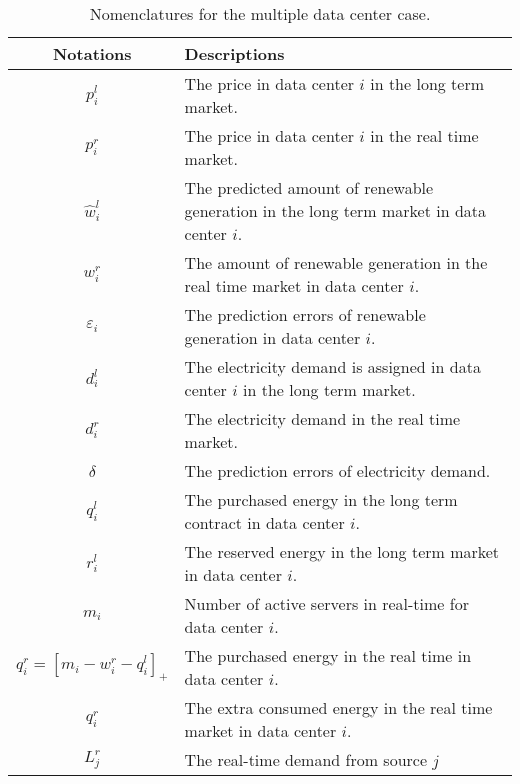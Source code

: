 \begin{table}
	\centering
	\caption{Nomenclatures for the multiple data center case.}
	\begin{tabular}{|c|p{4cm}|} \hline
		Notations & Descriptions \\ \hline \hline
		$p^{l}_i$ & The price in data center $i$ in the long term market. \\ \hline
		$p^{r}_i$ & The price in data center $i$ in the real time market. \\ \hline
		$\hat{w}^{l}_i$ & The predicted amount of renewable generation in the long term market in data center $i$. \\ \hline
		$w^{r}_i$ & The amount of renewable generation in the real time market in data center $i$. \\ \hline
		$\varepsilon_i$ & The prediction errors of renewable generation in data center $i$. \\ \hline
		$d^{l}_i$ & The electricity demand is assigned in data center $i$ in the long term market. \\ \hline
		$d^{r}_i$ & The electricity demand in the real time market. \\ \hline
		$\delta$ & The prediction errors of electricity demand. \\ \hline
		$q^{l}_i$ & The purchased energy in the long term contract in data center $i$. \\ \hline
		$r^{l}_i$ & The reserved energy in the long term market in data center $i$. \\ \hline
		${m}_i$ & Number of active servers in real-time for data center $i$. \\ \hline
		$q^{r}_i = [m_i-w^r_i-q^l_i]_+$ & The purchased energy in the real time in data center $i$. \\ \hline
		$q^{r}_i$ & The extra consumed energy in the real time market in data center $i$. \\ \hline
		$L^{r}_j$ & The real-time demand from source $j$\\ \hline
	\end{tabular}
\end{table}